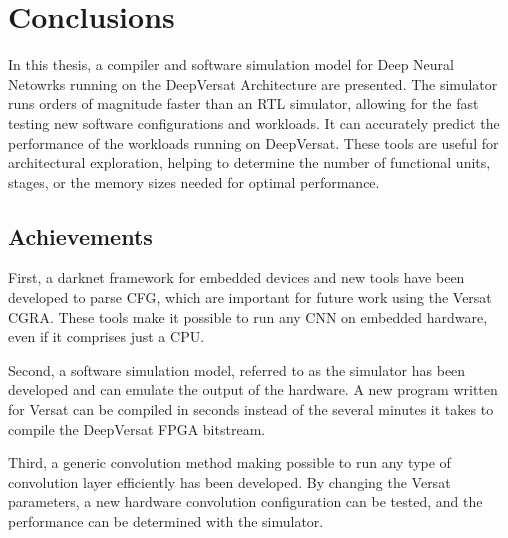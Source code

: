 
\chapter{Conclusions}
\label{chapter:conclusions}

In this thesis, a compiler and software simulation model for Deep Neural
Netowrks running on the DeepVersat Architecture are presented. The simulator
runs orders of magnitude faster than an RTL simulator, allowing for the fast
testing new software configurations and workloads. It can accurately predict the
performance of the workloads running on DeepVersat. These tools are useful for
architectural exploration, helping to determine the number of functional units,
stages, or the memory sizes needed for optimal performance.


\section{Achievements}
\label{section:achievements}

First, a darknet framework for embedded devices and new tools have been
developed to parse CFG, which are important for future work using the Versat
CGRA. These tools make it possible to run any CNN on embedded hardware, even if
it comprises just a CPU.

Second, a software simulation model, referred to as the simulator has been
developed and can emulate the output of the hardware. A new program written for
Versat can be compiled in seconds instead of the several minutes it takes to
compile the DeepVersat FPGA bitstream.

Third, a generic convolution method making possible to run any type of
convolution layer efficiently has been developed. By changing the Versat
parameters, a new hardware convolution configuration can be tested, and the
performance can be determined with the simulator.

